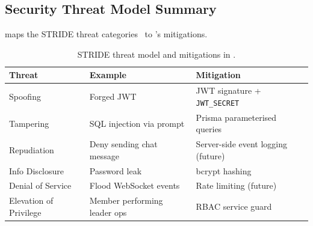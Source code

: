 \subsection{Security Threat Model Summary}

 maps the STRIDE threat categories~\cite{kohnfelder1999threats}
to \echoray{}'s mitigations.

\begin{table}[H]
  \centering
  \caption{STRIDE threat model and mitigations in \echoray{}.}
  \label{tab:threats}
  \setlength{\tabcolsep}{4pt}
  \begin{tabular}{lll}
    \toprule
    \textbf{Threat}      & \textbf{Example}              & \textbf{Mitigation} \\
    \midrule
    Spoofing             & Forged JWT                    & JWT signature + \texttt{JWT\_SECRET} \\
    Tampering            & SQL injection via prompt      & Prisma parameterised queries \\
    Repudiation          & Deny sending chat message     & Server-side event logging (future) \\
    Info Disclosure      & Password leak                 & bcrypt hashing \\
    Denial of Service    & Flood WebSocket events        & Rate limiting (future) \\
    Elevation of Privilege & Member performing leader ops & RBAC service guard \\
    \bottomrule
  \end{tabular}
\end{table}
